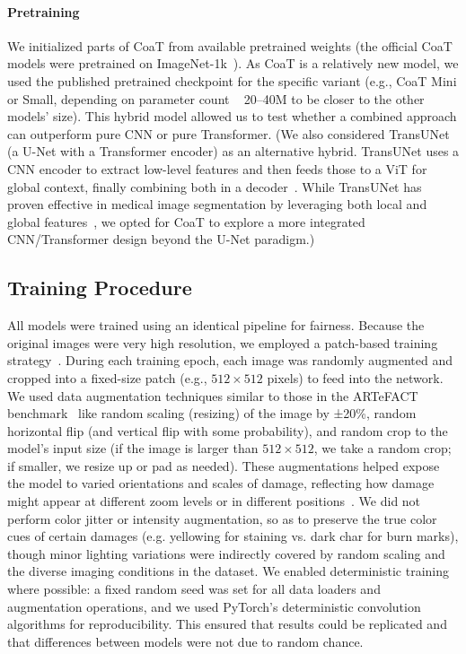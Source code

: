 \documentclass[conference]{IEEEtran}
\begin{document}
\paragraph{Pretraining}
We initialized parts of CoaT from available pretrained weights (the official CoaT models were pretrained on ImageNet-1k~\cite{xu_co-scale_2021}). As CoaT is a relatively new model, we used the published pretrained checkpoint for the specific variant (e.g., CoaT Mini or Small, depending on parameter count ~ 20–40M to be closer to the other models’ size). This hybrid model allowed us to test whether a combined approach can outperform pure CNN or pure Transformer.
(We also considered TransUNet~\cite{chen_transunet_2021} (a U-Net with a Transformer encoder) as an alternative hybrid. TransUNet uses a CNN encoder to extract low-level features and then feeds those to a ViT for global context, finally combining both in a decoder~\cite{chen_transunet_2021}. While TransUNet has proven effective in medical image segmentation by leveraging both local and global features~\cite{chen_transunet_2021}, we opted for CoaT to explore a more integrated CNN/Transformer design beyond the U-Net paradigm.)

\subsection*{Training Procedure}
All models were trained using an identical pipeline for fairness. Because the original images were very high resolution, we employed a patch-based training strategy~\cite{ivanova_artefact_2024}. During each training epoch, each image was randomly augmented and cropped into a fixed-size patch (e.g., $512×512$ pixels) to feed into the network. We used data augmentation techniques similar to those in the ARTeFACT benchmark~\cite{ivanova_artefact_2024} like random scaling (resizing) of the image by ±20\%, random horizontal flip (and vertical flip with some probability), and random crop to the model’s input size (if the image is larger than $512×512$, we take a random crop; if smaller, we resize up or pad as needed). These augmentations helped expose the model to varied orientations and scales of damage, reflecting how damage might appear at different zoom levels or in different positions~\cite{ivanova_artefact_2024}. We did not perform color jitter or intensity augmentation, so as to preserve the true color cues of certain damages (e.g. yellowing for staining vs. dark char for burn marks), though minor lighting variations were indirectly covered by random scaling and the diverse imaging conditions in the dataset. We enabled deterministic training where possible: a fixed random seed was set for all data loaders and augmentation operations, and we used PyTorch’s deterministic convolution algorithms for reproducibility. This ensured that results could be replicated and that differences between models were not due to random chance.
\end{document}
